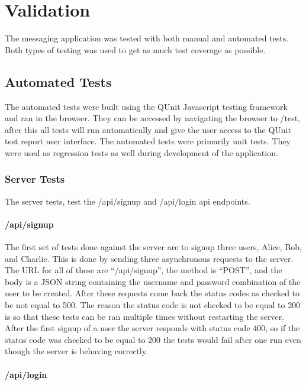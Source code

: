 \chapter{Validation}


The messaging application was tested with both manual and automated tests. Both types of testing was used to get as much test coverage as possible.


\section{Automated Tests}


The automated tests were built using the QUnit Javascript testing framework and ran in the browser.\cite{qunit} They can be accessed by navigating the browser to /test, after this all tests will run automatically and give the user access to the QUnit test report user interface. The automated tests were primarily unit tests. They were used as regression tests as well during development of the application. 


\subsection{Server Tests}


The server tests, test the /api/signup and /api/login api endpoints. 


\subsubsection{/api/signup}


The first set of tests done against the server are to signup three users, Alice, Bob, and Charlie.
This is done by sending three asynchronous requests to the server. The URL for all of these are “/api/signup”, the method is “POST”, and the body is a JSON string containing the username and password combination of the user to be created. After these requests come back the status codes as checked to be not equal to 500. The reason the status code is not checked to be equal to 200 is so that these tests can be ran multiple times without restarting the server. After the first signup of a user the server responds with status code 400, so if the status code was checked to be equal to 200 the tests would fail after one run even though the server is behaving correctly.


\subsubsection{/api/login}


